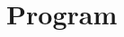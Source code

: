 \documentclass[../dolphin-book-2023.tex]{subfiles}
\begin{document}
\chapter{Program}



\end{document}

